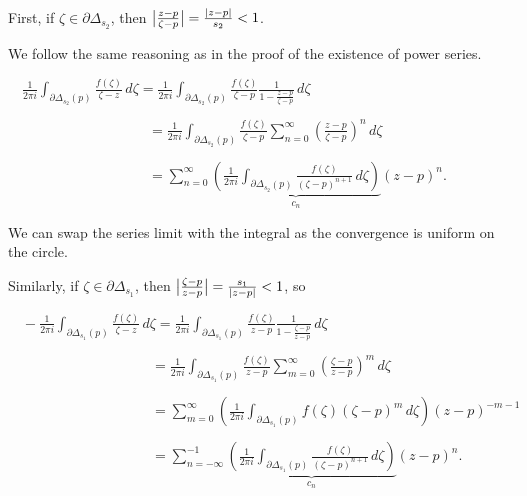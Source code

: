 \documentclass[10pt,aspectratio=169]{beamer}
\begin{document}
\begin{frame}
First, if $\zeta \in \partial \Delta_{s_2}$, then
$\bigl\lvert {\frac{z-p}{\zeta-p}} \bigr\rvert = \frac{\lvert {z-p} \rvert}{s_2} < 1$.

\medskip
\pause

We follow the same reasoning as in the proof of the existence
of power series.

\medskip
\pause

$\displaystyle
\quad
\frac{1}{2\pi i}
\int_{\partial \Delta_{s_2}(p)} \frac{f(\zeta)}{\zeta-z} \, d\zeta 
=
\frac{1}{2\pi i}
\int_{\partial \Delta_{s_2}(p)} \frac{f(\zeta)}{\zeta-p}
\frac{1}{1-\frac{z-p}{\zeta-p}} \, d\zeta
$

\medskip
\pause

$\displaystyle
\qquad \qquad \qquad
\qquad \qquad
=
\frac{1}{2\pi i}
\int_{\partial \Delta_{s_2}(p)} \frac{f(\zeta)}{\zeta-p}
\sum_{n=0}^\infty
{\left(\frac{z-p}{\zeta-p}\right)}^n \, d\zeta
$

\medskip
\pause

$\displaystyle
\qquad \qquad \qquad
\qquad \qquad
=
\sum_{n=0}^\infty
\underbrace{
\left(
\frac{1}{2\pi i}
\int_{\partial \Delta_{s_2}(p)} \frac{f(\zeta)}{{(\zeta-p)}^{n+1}}
 \, d\zeta
\right)
}_{c_n}
{(z-p)}^n .
$

\medskip
\pause

We can swap the series
limit with the integral as the convergence is uniform on the circle.
\end{frame}

\begin{frame}
Similarly, 
if $\zeta \in \partial \Delta_{s_1}$, then
$\bigl\lvert {\frac{\zeta-p}{z-p}} \bigr\rvert = \frac{s_1}{\lvert {z-p} \rvert} < 1$, so

\medskip
\medskip
\pause

$\displaystyle
\quad
-\frac{1}{2\pi i}
\int_{\partial \Delta_{s_1}(p)} \frac{f(\zeta)}{\zeta-z} \, d\zeta 
= 
\frac{1}{2\pi i}
\int_{\partial \Delta_{s_1}(p)} \frac{f(\zeta)}{z-p}
\frac{1}{1-\frac{\zeta-p}{z-p}} \, d\zeta
$

\medskip
\pause

$\displaystyle
\qquad \qquad \qquad
\qquad \qquad ~
=
\frac{1}{2\pi i}
\int_{\partial \Delta_{s_1}(p)} \frac{f(\zeta)}{z-p}
\sum_{m=0}^\infty
{\left(\frac{\zeta-p}{z-p}\right)}^m \, d\zeta
$

\medskip
\pause

$\displaystyle
\qquad \qquad \qquad
\qquad \qquad ~
=
\sum_{m=0}^\infty
\left(
\frac{1}{2\pi i}
\int_{\partial \Delta_{s_1}(p)} f(\zeta){(\zeta-p)}^{m}
 \, d\zeta
\right)
{(z-p)}^{-m-1}
$

\medskip
\pause

$\displaystyle
\qquad \qquad \qquad
\qquad \qquad ~
=
\sum_{n=-\infty}^{-1}
\underbrace{
\left(
\frac{1}{2\pi i}
\int_{\partial \Delta_{s_1}(p)} \frac{f(\zeta)}{{(\zeta-p)}^{n+1}}
 \, d\zeta
\right)
}_{c_n}
{(z-p)}^{n} .
$
\end{frame}
\end{document}
